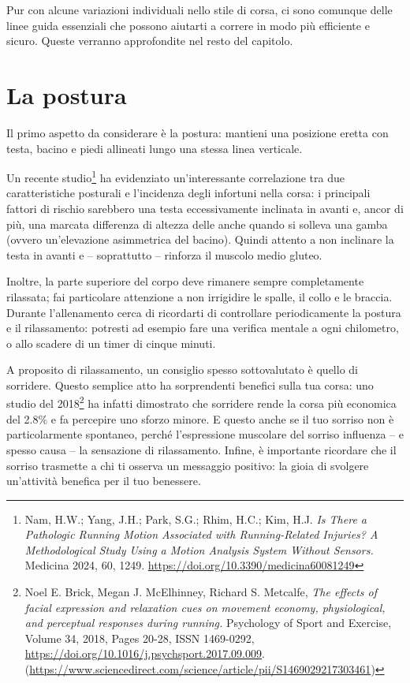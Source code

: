 Pur con alcune variazioni individuali nello stile di corsa,
ci sono comunque delle linee guida essenziali che possono aiutarti a correre in modo più efficiente e sicuro.
Queste verranno approfondite nel resto del capitolo.

\section{La postura}

Il primo aspetto da considerare è la postura:
mantieni una posizione eretta con testa, bacino e piedi allineati lungo una stessa linea verticale.

Un recente studio\footnote{
    Nam, H.W.; Yang, J.H.; Park, S.G.; Rhim, H.C.; Kim, H.J.
    \emph{Is There a Pathologic Running Motion Associated with Running-Related Injuries?
    A Methodological Study Using a Motion Analysis System Without Sensors.}
    Medicina 2024, 60, 1249.
    \url{https://doi.org/10.3390/medicina60081249}
}
ha evidenziato un'interessante correlazione tra due caratteristiche posturali
e l'incidenza degli infortuni nella corsa:
i principali fattori di rischio sarebbero una testa eccessivamente inclinata in avanti e, 
ancor di più, una marcata differenza di altezza delle anche quando si solleva una gamba
(ovvero un'elevazione asimmetrica del bacino).
Quindi attento a non inclinare la testa in avanti e
-- soprattutto -- rinforza il muscolo medio gluteo.

Inoltre, la parte superiore del corpo deve rimanere sempre completamente rilassata;
fai particolare attenzione a non irrigidire le spalle, il collo e le braccia.
Durante l'allenamento cerca di ricordarti di controllare periodicamente
la postura e il rilassamento: potresti ad esempio fare una verifica
mentale a ogni chilometro, o allo scadere di un timer di cinque minuti.

A proposito di rilassamento, un consiglio spesso sottovalutato è quello di sorridere.
Questo semplice atto ha sorprendenti benefici sulla tua corsa:
uno studio del 2018\footnote{
    Noel E. Brick, Megan J. McElhinney, Richard S. Metcalfe,
    \emph{The effects of facial expression and relaxation cues on movement economy, physiological, and perceptual responses during running.}
    Psychology of Sport and Exercise,
    Volume 34,
    2018,
    Pages 20-28,
    ISSN 1469-0292,
    \url{https://doi.org/10.1016/j.psychsport.2017.09.009}.  (\url{https://www.sciencedirect.com/science/article/pii/S1469029217303461})
}
ha infatti dimostrato che sorridere
rende la corsa più economica del 2.8\% e fa percepire uno sforzo minore.
E questo anche se il tuo sorriso non è particolarmente spontaneo, 
perché l'espressione muscolare del sorriso
influenza -- e spesso causa -- la sensazione di rilassamento.
Infine, è importante ricordare che il sorriso trasmette
a chi ti osserva un messaggio positivo:
la gioia di svolgere un'attività benefica per il
tuo benessere.

